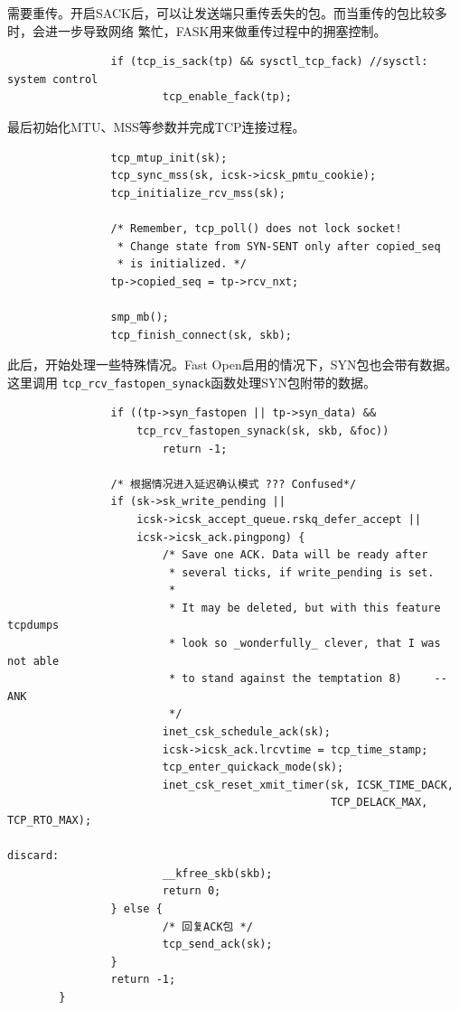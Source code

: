 需要重传。开启SACK后，可以让发送端只重传丢失的包。而当重传的包比较多时，会进一步导致网络
繁忙，FASK用来做重传过程中的拥塞控制。
\begin{verbatim}
                if (tcp_is_sack(tp) && sysctl_tcp_fack) //sysctl: system control
                        tcp_enable_fack(tp);
\end{verbatim}
最后初始化MTU、MSS等参数并完成TCP连接过程。
\begin{verbatim}
                tcp_mtup_init(sk);
                tcp_sync_mss(sk, icsk->icsk_pmtu_cookie);
                tcp_initialize_rcv_mss(sk);

                /* Remember, tcp_poll() does not lock socket!
                 * Change state from SYN-SENT only after copied_seq
                 * is initialized. */
                tp->copied_seq = tp->rcv_nxt;

                smp_mb();
                tcp_finish_connect(sk, skb);
\end{verbatim}
此后，开始处理一些特殊情况。Fast Open启用的情况下，SYN包也会带有数据。这里调用
\texttt{tcp_rcv_fastopen_synack}函数处理SYN包附带的数据。
\begin{verbatim}
                if ((tp->syn_fastopen || tp->syn_data) &&
                    tcp_rcv_fastopen_synack(sk, skb, &foc))
                        return -1;
                
                /* 根据情况进入延迟确认模式 ??? Confused*/
                if (sk->sk_write_pending ||
                    icsk->icsk_accept_queue.rskq_defer_accept ||
                    icsk->icsk_ack.pingpong) {
                        /* Save one ACK. Data will be ready after
                         * several ticks, if write_pending is set.
                         *
                         * It may be deleted, but with this feature tcpdumps
                         * look so _wonderfully_ clever, that I was not able
                         * to stand against the temptation 8)     --ANK
                         */
                        inet_csk_schedule_ack(sk);
                        icsk->icsk_ack.lrcvtime = tcp_time_stamp;
                        tcp_enter_quickack_mode(sk);
                        inet_csk_reset_xmit_timer(sk, ICSK_TIME_DACK,
                                                  TCP_DELACK_MAX, TCP_RTO_MAX);

discard:
                        __kfree_skb(skb);
                        return 0;
                } else {
                        /* 回复ACK包 */
                        tcp_send_ack(sk);
                }
                return -1;
        }
\end{verbatim}

